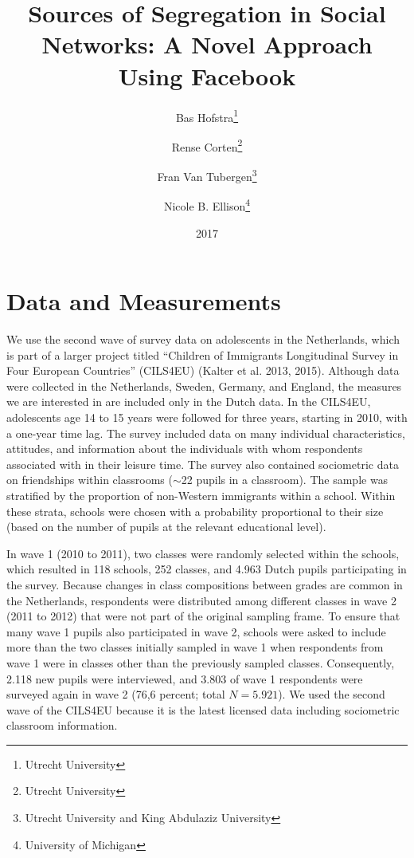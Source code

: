 \documentclass[letterpaper]{article} %
\title{Sources of Segregation in Social Networks: A Novel Approach Using Facebook}
\date{2017}
\author{Bas Hofstra\thanks{Utrecht University} \and Rense Corten\thanks{Utrecht University} \and Fran Van Tubergen\thanks{Utrecht University and King Abdulaziz University} \and Nicole B. Ellison\thanks{University of Michigan}}
\begin{document}
\maketitle

\section{Data and Measurements}
We use the second wave of survey data on adolescents in the Netherlands, which is part of a larger project titled ``Children of Immigrants Longitudinal Survey in Four European Countries'' (CILS4EU) (Kalter et al. 2013, 2015). Although data were collected in the Netherlands, Sweden, Germany, and England, the measures we are interested in are
included only in the Dutch data. In the CILS4EU, adolescents age 14 to 15 years were followed for three years, starting in 2010, with a one-year time lag. The survey included data on many individual characteristics, attitudes,
and information about the individuals with whom respondents associated with in their leisure time. The survey also contained sociometric data on friendships within classrooms ($\sim$22 pupils in a classroom). The sample was stratified by the proportion of non-Western immigrants within a school. Within these strata, schools were chosen with
a probability proportional to their size (based on the number of pupils at the relevant educational level).

In wave 1 (2010 to 2011), two classes were randomly selected within the schools, which resulted in 118 schools, 252 classes, and 4.963 Dutch pupils participating in the survey. Because changes in class compositions between grades are common in the Netherlands, respondents were distributed among different classes in wave 2 (2011 to 2012) that
were not part of the original sampling frame. To ensure that many wave 1 pupils also participated in wave 2, schools were asked to include more than the two classes initially sampled in wave 1 when respondents from wave 1 were in classes other than the previously sampled classes. Consequently, 2.118 new pupils were interviewed, and 3.803 of
wave 1 respondents were surveyed again in wave 2 (76,6 percent; total $N = 5.921$). We used the second wave of the CILS4EU because it is the latest licensed data including sociometric classroom information.
\end{document}
